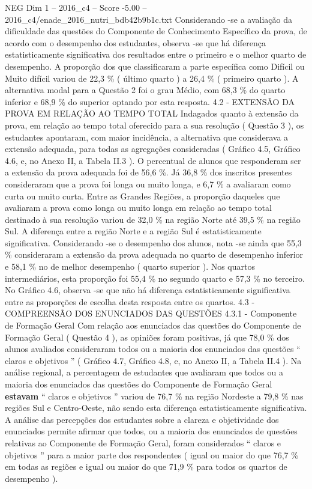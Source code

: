 \begin{textsample}{NEG Dim 1 – 2016\_c4 – Score -5.00 – 2016\_c4/enade\_2016\_nutri\_bdb42b9b1c.txt}
Considerando -se a avaliação da dificuldade das questões do Componente de Conhecimento Específico da prova, de acordo com o desempenho dos estudantes, observa -se que há diferença estatisticamente significativa dos resultados entre o primeiro e o melhor quarto de desempenho.
A proporção dos que classificaram a parte específica como Difícil ou Muito difícil variou de 22,3 \% ( último quarto ) a 26,4 \% ( primeiro quarto ).
A alternativa modal para a Questão 2 foi o grau Médio, com 68,3 \% do quarto inferior e 68,9 \% do superior optando por esta resposta. 4.2 - EXTENSÃO DA PROVA EM RELAÇÃO AO TEMPO TOTAL Indagados quanto à extensão da prova, em relação ao tempo total oferecido para a sua resolução ( Questão 3 ), os estudantes apontaram, com maior incidência, a alternativa que considerava a extensão adequada, para todas as agregações consideradas ( Gráfico 4.5, Gráfico 4.6, e, no Anexo II, a Tabela II.3 ).
O percentual de alunos que responderam ser a extensão da prova adequada foi de 56,6 \%.
Já 36,8 \% dos inscritos presentes consideraram que a prova foi longa ou muito longa, e 6,7 \% a avaliaram como curta ou muito curta.
Entre as Grandes Regiões, a proporção daqueles que avaliaram a prova como longa ou muito longa em relação ao tempo total destinado à sua resolução variou de 32,0 \% na região Norte até 39,5 \% na região Sul.
A diferença entre a região Norte e a região Sul é estatisticamente significativa.
Considerando -se o desempenho dos alunos, nota -se ainda que 55,3 \% consideraram a extensão da prova adequada no quarto de desempenho inferior e 58,1 \% no de melhor desempenho ( quarto superior ).
Nos quartos intermediários, esta proporção foi 55,4 \% no segundo quarto e 57,3 \% no terceiro.
No Gráfico 4.6, observa -se que não há diferença estatisticamente significativa entre as proporções de escolha desta resposta entre os quartos. 4.3 - COMPREENSÃO DOS ENUNCIADOS DAS QUESTÕES 4.3.1 - Componente de Formação Geral Com relação aos enunciados das questões do Componente de Formação Geral ( Questão 4 ), as opiniões foram positivas, já que 78,0 \% dos alunos avaliados consideraram todos ou a maioria dos enunciados das questões “ claros e objetivos ” ( Gráfico 4.7, Gráfico 4.8, e, no Anexo II, a Tabela II.4 ).
Na análise regional, a percentagem de estudantes que avaliaram que todos ou a maioria dos enunciados das questões do Componente de Formação Geral \textbf{estavam} “ claros e objetivos ” variou de 76,7 \% na região Nordeste a 79,8 \% nas regiões Sul e Centro-Oeste, não sendo esta diferença estatisticamente significativa.
A análise das percepções dos estudantes sobre a clareza e objetividade dos enunciados permite afirmar que todos, ou a maioria dos enunciados de questões relativas ao Componente de Formação Geral, foram considerados “ claros e objetivos ” para a maior parte dos respondentes ( igual ou maior do que 76,7 \% em todas as regiões e igual ou maior do que 71,9 \% para todos os quartos de desempenho ).

\end{textsample}
